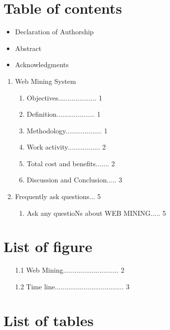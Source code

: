 \documentclass[a4paper,10pt]{article}
\begin{document}
\section{Table of contents}
\begin{itemize}
	\color{red}
	\item Declaration of Authorship
	\item Abstract
	\item Acknowledgments
\end{itemize}
\begin{enumerate}
	\color{red}
	\item Web Mining System
	\begin{enumerate}
		\item Objectives.................... 1
		\item Definition.................... 1
		\item Methodology................... 1
		\item Work activity................. 2
		\item Total cost and benefits....... 2
		\item Discussion and Conclusion..... 3
	\end{enumerate}
	\item Frequently ask questions... 5
	\begin{enumerate}
		\item Ask any questioNs about WEB MINING..... 5
	\end{enumerate}
\end{enumerate}
\newpage
\section{List of figure}
\begin{enumerate}
	\color{red}
	\item[1.1] Web Mining............................. 2
	\item[1.2] Time line.................................... 3
\end{enumerate}
\newpage
\section{List of tables}
\newpage
\end{document}

